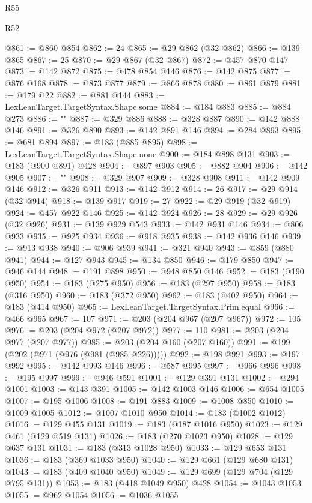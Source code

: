 \begin{lexlean}{R55}
\begin{lexlean}{R52}
\begin{coremodule}
{{{{{{{{{{{{{{{{{{{{{{{{{{{{{{{{{{{{{{{{{{{{{{{{{{{{{{{{{{{{{{{{{{{{{{{{{{{{{{{{{{{{{{{{{{{{{{{{{{{{{{{{{{{{{{{{{{{{{{{{{{{{{{{{{{{{{{{{{{{{{{{{{{{{{{{{{{{{{{{{{{{{{{{{{{{{{{{{{{{{{{{{{{{{{{{{{{{{{{@861 := @860 @854
@862 := 24
@865 := @29 @862 (@32 @862)
@866 := @139 @865
@867 := 25
@870 := @29 @867 (@32 @867)
@872 := @457 @870 @147
@873 := @142 @872
@875 := @478 @854 @146
@876 := @142 @875
@877 := @876 @168
@878 := @873 @877
@879 := @866 @878
@880 := @861 @879
@881 := @179 @22
@882 := @881 @144
@883 := LexLeanTarget.TargetSyntax.Shape.some
@884 := @184 @883
@885 := @884 @273
@886 := "{"
@887 := @329 @886
@888 := @328 @887
@890 := @142 @888 @146
@891 := @326 @890
@893 := @142 @891 @146
@894 := @284 @893
@895 := @681 @894
@897 := @183 (@885 @895)
@898 := LexLeanTarget.TargetSyntax.Shape.none
@900 := @184 @898 @131
@903 := @183 (@900 @891) @428
@904 := @897 @903
@905 := @882 @904
@906 := @142 @905
@907 := "}"
@908 := @329 @907
@909 := @328 @908
@911 := @142 @909 @146
@912 := @326 @911
@913 := @142 @912
@914 := 26
@917 := @29 @914 (@32 @914)
@918 := @139 @917
@919 := 27
@922 := @29 @919 (@32 @919)
@924 := @457 @922 @146
@925 := @142 @924
@926 := 28
@929 := @29 @926 (@32 @926)
@931 := @139 @929 @543
@933 := @142 @931 @146
@934 := @806 @933
@935 := @925 @934
@936 := @918 @935
@938 := @142 @936 @146
@939 := @913 @938
@940 := @906 @939
@941 := @321 @940
@943 := @859 (@880 @941)
@944 := @127 @943
@945 := @134 @850
@946 := @179 @850
@947 := @946 @144
@948 := @191 @898
@950 := @948 @850 @146
@952 := @183 (@190 @950)
@954 := @183 (@275 @950)
@956 := @183 (@297 @950)
@958 := @183 (@316 @950)
@960 := @183 (@372 @950)
@962 := @183 (@402 @950)
@964 := @183 (@414 @950)
@965 := LexLeanTarget.TargetSyntax.Prim.equal
@966 := @466 @965
@967 := 107
@971 := @203 (@204 @967 (@207 @967))
@972 := 105
@976 := @203 (@204 @972 (@207 @972))
@977 := 110
@981 := @203 (@204 @977 (@207 @977))
@985 := @203 (@204 @160 (@207 @160))
@991 := @199 (@202 (@971 (@976 (@981 (@985 @226)))))
@992 := @198 @991
@993 := @197 @992
@995 := @142 @993 @146
@996 := @587 @995
@997 := @966 @996
@998 := @195 @997
@999 := @946 @591
@1001 := @129 @391 @131
@1002 := @294 @1001
@1003 := @143 @391
@1005 := @142 @1003 @146
@1006 := @654 @1005
@1007 := @195 @1006
@1008 := @191 @883
@1009 := @1008 @850
@1010 := @1009 @1005
@1012 := @1007 @1010 @950
@1014 := @183 (@1002 @1012)
@1016 := @129 @455 @131
@1019 := @183 (@187 @1016 @950)
@1023 := @129 @461 (@129 @519 @131)
@1026 := @183 (@270 @1023 @950)
@1028 := @129 @637 @131
@1031 := @183 (@313 @1028 @950)
@1033 := @129 @653 @131
@1036 := @183 (@369 @1033 @950)
@1040 := @129 @661 (@129 @680 @131)
@1043 := @183 (@409 @1040 @950)
@1049 := @129 @699 (@129 @704 (@129 @795 @131))
@1053 := @183 (@418 @1049 @950) @428
@1054 := @1043 @1053
@1055 := @962 @1054
@1056 := @1036 @1055
}}}}}}}}}}}}}}}}}}}}}}}}}}}}}}}}}}}}}}}}}}}}}}}}}}}}}}}}}}}}}}}}}}}}}}}}}}}}}}}}}}}}}}}}}}}}}}}}}}}}}}}}}}}}}}}}}}}}}}}}}}}}}}}}}}}}}}}}}}}}}}}}}}}}}}}}}}}}}}}}}}}}}}}}}}}}}}}}}}}}}}}}}}}}}}}}}}}}}}
\end{coremodule}
\end{lexlean}
\end{lexlean}
